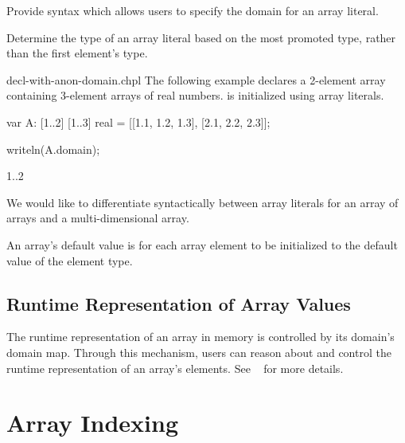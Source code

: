 \begin{future}
Provide syntax which allows users to specify the domain for an array
literal.
\end{future}

\begin{future}
Determine the type of an array literal based on the most promoted type, 
rather than the first element's type.
\end{future}

\begin{chapelexample}{decl-with-anon-domain.chpl}
The following example declares a 2-element array  containing 3-element
arrays of real numbers.   is initialized using array literals.
\begin{chapel}
var A: [1..2] [1..3] real = [[1.1, 1.2, 1.3], [2.1, 2.2, 2.3]];
\end{chapel}
\begin{chapelpost}
writeln(A.domain);
\end{chapelpost}
\begin{chapeloutput}
{1..2}
\end{chapeloutput}
\end{chapelexample}

\begin{openissue}
We would like to differentiate syntactically between array literals for an array
of arrays and a multi-dimensional array. 
\end{openissue}

An array's default value is for each array element to be initialized to
the default value of the element type.

\subsection{Runtime Representation of Array Values}
\label{Array_Runtime_Representation}

The runtime representation of an array in memory is controlled by its
domain's domain map.  Through this mechanism, users can reason about
and control the runtime representation of an array's elements.  See
~ for more details.


\section{Array Indexing}
\label{Array_Indexing}

